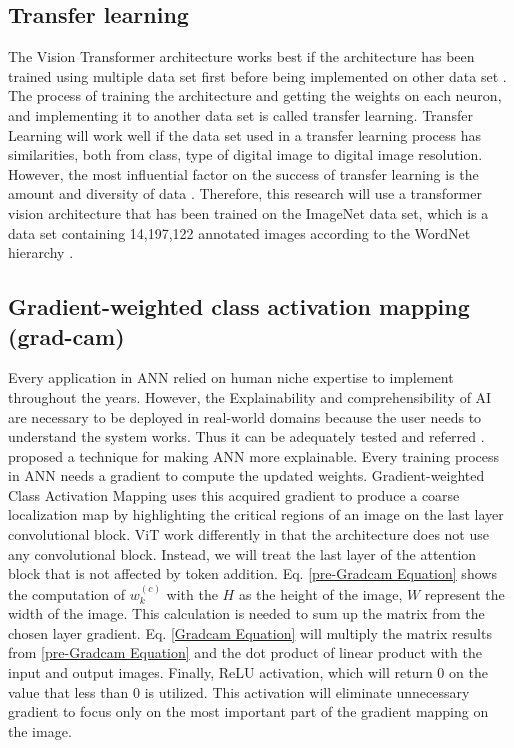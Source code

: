 \documentclass{article}
\begin{document}
\subsection{Transfer learning}
The Vision Transformer architecture works best if the architecture has been trained using multiple data set first before being implemented on other data set \citep{Dosovitskiy2020}. The process of training the architecture and getting the weights on each neuron, and implementing it to another data set is called transfer learning. Transfer Learning will work well if the data set used in a transfer learning process has similarities, both from class, type of digital image to digital image resolution. However, the most influential factor on the success of transfer learning is the amount and diversity of data \citep{Weiss2016}. Therefore, this research will use a transformer vision architecture that has been trained on the ImageNet \citep{deng2009imagenet} data set, which is a data set containing 14,197,122 annotated images according to the WordNet hierarchy \citep{Russakovsky2015}.

\subsection{Gradient-weighted class activation mapping (grad-cam)}
Every application in ANN relied on human niche expertise to implement throughout the years. However, the Explainability and comprehensibility of AI are necessary to be deployed in real-world domains because the user needs to understand the system works. Thus it can be adequately tested and referred \citep{yampolskiy2019unexplainable}.
\cite{Selvaraju2020gradcam} proposed a technique for making ANN more explainable. Every training process in ANN needs a gradient to compute the updated weights. Gradient-weighted Class Activation Mapping uses this acquired gradient to produce a coarse localization map by highlighting the critical regions of an image on the last layer convolutional block.
ViT work differently in that the architecture does not use any convolutional block. Instead, we will treat the last layer of the attention block that is not affected by token addition. Eq. \ref{pre-Gradcam Equation}  shows the computation of $w_k^{\left(c\right)}$ with the $H$ as the height of the image, $W$ represent the width of the image. This calculation is needed to sum up the matrix from the chosen layer gradient. Eq. \ref{Gradcam Equation} will multiply the matrix results from \ref{pre-Gradcam Equation} and the dot product of linear product with the input and output images. Finally, ReLU \citep{agarap2018relu} activation, which will return 0 on the value that less than 0  is utilized. This activation will eliminate unnecessary gradient to focus only on the most important part of the gradient mapping on the image.
\end{document}
